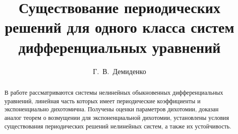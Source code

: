 


\usepackage[russian]{nla}

%
%


%




%
\fi

\title{Существование периодических решений
для одного класса систем дифференциальных уравнений}
\author{Г.~В.~Демиденко%
} %


\maketitle

\begin{abstract}
В работе рассматриваются системы нелинейных обыкновенных дифференциальных уравнений, линейная часть которых имеет периодические коэффициенты и экспоненциально дихотомична. Получены оценки параметров дихотомии, доказан аналог теорем о возмущении для экспоненциальной дихотомии, установлены условия существования периодических решений нелинейных систем, а также их устойчивость.

\end{abstract}

